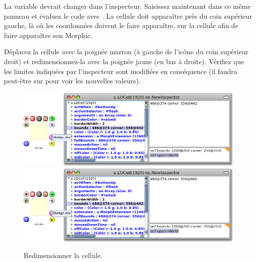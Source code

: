 \documentclass[a4paper,10pt,twoside]{book}
\begin{document}

La variable  devrait changer dans l'inspecteur. 
Saisissez maintenant  dans
  ce même panneau et évaluez le code avec . La cellule
  doit apparaître près du coin supérieur gauche, là où les coordonnées
   doivent le faire apparaître.
\Metaclickz{} sur la cellule afin de faire apparaître son
 Morphic.

Déplacez la cellule avec la poignée marron (à 
gauche de l'icône du coin supérieur droit) et redimensionnez-la avec la poignée jaune (en bas à droite).
Vérifiez que les limites indiquées par l'inspecteur sont modifiées en
conséquence (il faudra peut-être \actclick{} sur  pour voir les nouvelles valeurs). %

\begin{figure}[htbp]
\centering
\ifluluelse
	{\includegraphics[width=\textwidth]{LOCellResize} }
	{\includegraphics[scale=0.7]{LOCellResize} }
\caption{Redimensionner la cellule.}
\end{figure}

\end{document}
